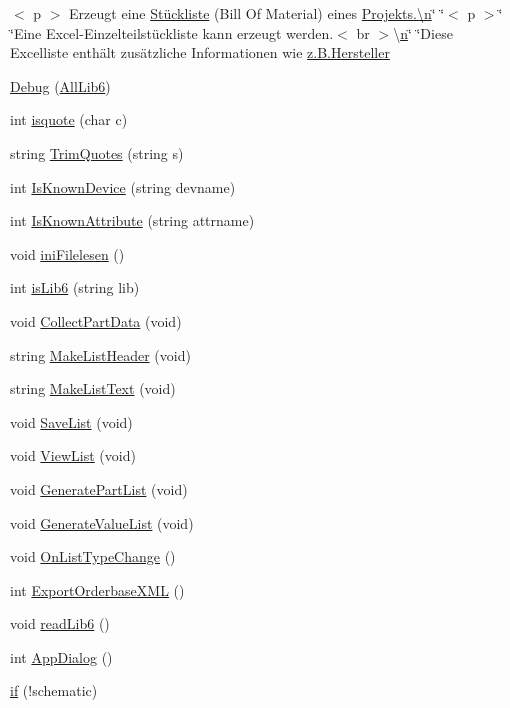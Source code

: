 \begin{DoxyCompactItemize}
\item 
$<$ p $>$ Erzeugt eine \hyperlink{bom_8ulp_ac22615d76b8e399dd248c98b498fd6f0}{Stückliste} (Bill Of Material) eines \hyperlink{read_database_8ulp_a76f11d9a0a47b94f72c2d0e77fb32240}{Projekts.\textbackslash{}n}\char`\"{} \char`\"{}$<$ p $>$\char`\"{} \char`\"{}Eine Excel-\/Einzelteilstückliste kann erzeugt werden.$<$ br $>$\textbackslash{}\hyperlink{read_database_8ulp_a76f11d9a0a47b94f72c2d0e77fb32240}{n}\char`\"{} \char`\"{}Diese Excelliste enthält zusätzliche Informationen wie \hyperlink{test_8ulp_a03dd05fe151d0e9f9edf96078bc234d4}{z.\+B.\+Hersteller}
\item 
\hyperlink{bom_8ulp_a037d9c41c2eb91966f712cb2269ae172}{Debug} (\hyperlink{bom_8ulp_a50dee73f73f0902f6c035e550bf1ad3c}{All\+Lib6})
\item 
int \hyperlink{bom_8ulp_a86fcd313b99359fe147a3d51a3f141bd}{isquote} (char c)
\item 
string \hyperlink{bom_8ulp_a8911b982f3199b7289cfcabfd41eb10c}{Trim\+Quotes} (string s)
\item 
int \hyperlink{bom_8ulp_a98c5fb24e17cc7e4df2cf1c25897a490}{Is\+Known\+Device} (string devname)
\item 
int \hyperlink{bom_8ulp_ace0ed14cfac73915e13738ced4325edd}{Is\+Known\+Attribute} (string attrname)
\item 
void \hyperlink{bom_8ulp_a5155b4a449afb07c498f38fcc879cb9d}{ini\+Filelesen} ()
\item 
int \hyperlink{bom_8ulp_ac4bbb89d9194f6290ab2e235c7594ee0}{is\+Lib6} (string lib)
\item 
void \hyperlink{bom_8ulp_aad335cd4f31b4e286cbe4b5392dd7126}{Collect\+Part\+Data} (void)
\item 
string \hyperlink{bom_8ulp_ab85f19b78b26c55cc788d746eb5b5b5b}{Make\+List\+Header} (void)
\item 
string \hyperlink{bom_8ulp_a28596f37f9bae6eeb196f53c3d2278b5}{Make\+List\+Text} (void)
\item 
void \hyperlink{bom_8ulp_aafc2af1760a717175bc90b527d4133e5}{Save\+List} (void)
\item 
void \hyperlink{bom_8ulp_a8f4fc648dc7938d047d127805814ec98}{View\+List} (void)
\item 
void \hyperlink{bom_8ulp_aecaa48a1c2347b452d89b6e168ac4d5a}{Generate\+Part\+List} (void)
\item 
void \hyperlink{bom_8ulp_a2503be692be67c975c546902d459e4ce}{Generate\+Value\+List} (void)
\item 
void \hyperlink{bom_8ulp_abde5f88458216ec961d22e955c0aa0d5}{On\+List\+Type\+Change} ()
\item 
int \hyperlink{bom_8ulp_a37c92911d0ae2a220a84cb114c6e7409}{Export\+Orderbase\+X\+M\+L} ()
\item 
void \hyperlink{bom_8ulp_a0dee0bc13095fb8c9271b2ced7f184bd}{read\+Lib6} ()
\item 
int \hyperlink{bom_8ulp_aead4249333ece8e4aa63151e98919f4e}{App\+Dialog} ()
\item 
\hyperlink{bom_8ulp_a9106034e389d1f457801fc7ff188c023}{if} (!schematic)
\end{DoxyCompactItemize}
